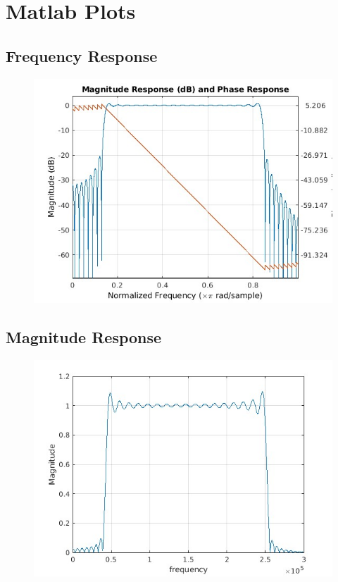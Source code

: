 \documentclass{article}
\begin{document}
\section{Matlab Plots}
\subsection{Frequency Response}
\begin{figure}[H]
\hspace*{-2.5cm}
    \centering
    \includegraphics[width=1.5\linewidth, height=0.65\textheight]{bandpass_freq.jpg}
    \label{fig:my_label}
\end{figure}

\subsection{Magnitude Response}
\begin{figure}[H]
\hspace*{-2.5cm}
    \centering
    \includegraphics[width=1.5\linewidth, height=0.65\textheight]{Bandpass_mag.jpg}
    \label{fig:my_label}
\end{figure}
\end{document}
